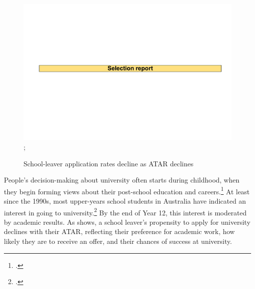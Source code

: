                 \begin{figure}
                    \caption{School-leaver application rates decline as ATAR declines\label{fig:1}}%
                    \includegraphics[page=3]{atlas/selection_chartdeck.pdf} 
                    {\textcite{ABSc}; \textcite{DepartmentofEducationandTraininga}}
                \end{figure}



People's decision-making about university often starts during childhood, when they begin forming views about their post-school education and careers.\footcites[][]{Gore2017a}[][]{Gore2017b}[][51]{RoyMorganResearch2009} 
At least since the 1990s, most upper-years school students in Australia have indicated an interest in going to university.\footcites[][15]{James2002}[][15--16]{MissionAustralia2016}[][48--50]{RoyMorganResearch2009}[][7--9]{ANOP/DEET1994} 
By the end of Year 12, this interest is moderated by academic results. As  shows, a school leaver's propensity to apply for university declines with their ATAR, reflecting their preference for academic work, how likely they are to receive an offer, and their chances of success at university.

